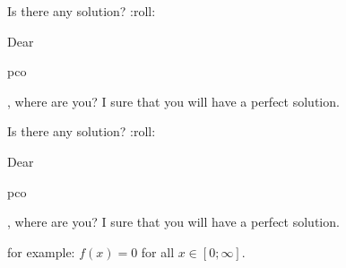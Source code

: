 \begin{solution}
	Is there any solution?  :roll: 

Dear \begin{bolded}pco\end{bolded}, where are you? I sure that you will have a perfect solution. 
\end{solution}



\begin{solution}
	\begin{tcolorbox}Is there any solution?  :roll: 

Dear \begin{bolded}pco\end{bolded}, where are you? I sure that you will have a perfect solution. \end{tcolorbox}
for example:  $f(x)=0$  for all $x \in [0; \infty ] $. 


\end{solution}



